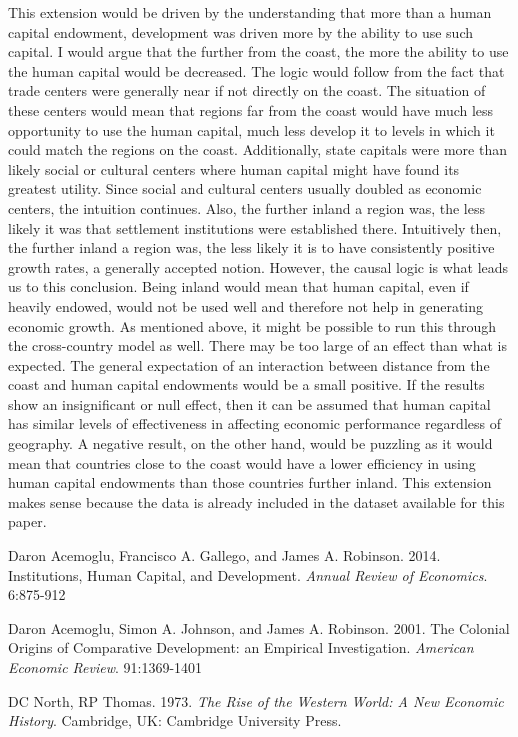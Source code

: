 \documentclass[12pt]{article}
\begin{document}
{This extension would be driven by the understanding that more than a human capital endowment, development was driven more by the ability to use such capital. I would argue that the further from the coast, the more the ability to use the human capital would be decreased. The logic would follow from the fact that trade centers were generally near if not directly on the coast. The situation of these centers would mean that regions far from the coast would have much less opportunity to use the human capital, much less develop it to levels in which it could match the regions on the coast. Additionally, state capitals were more than likely social or cultural centers where human capital might have found its greatest utility. Since social and cultural centers usually doubled as economic centers, the intuition continues. Also, the further inland a region was, the less likely it was that settlement institutions were established there. Intuitively then, the further inland a region was, the less likely it is to have consistently positive growth rates, a generally accepted notion. However, the causal logic is what leads us to this conclusion. Being inland would mean that human capital, even if heavily endowed, would not be used well and therefore not help in generating economic growth. As mentioned above, it might be possible to run this through the cross-country model as well. There may be too large of an effect than what is expected. The general expectation of an interaction between distance from the coast and human capital endowments would be a small positive. If the results show an insignificant or null effect, then it can be assumed that human capital has similar levels of effectiveness in affecting economic performance regardless of geography. A negative result, on the other hand, would be puzzling as it would mean that countries close to the coast would have a lower efficiency in using human capital endowments than those countries further inland. This extension makes sense because the data is already included in the dataset available for this paper.\\



\begin{thebibliography}{12}
Daron Acemoglu, Francisco A. Gallego, and James A. Robinson. 2014.
Institutions, Human Capital, and Development.
\textit{Annual Review of Economics}. 
6:875-912

Daron Acemoglu, Simon A. Johnson, and James A. Robinson. 2001.
The Colonial Origins of Comparative Development: an Empirical Investigation.
\textit{American Economic Review}. 
91:1369-1401
 
DC North, RP Thomas. 1973. 
\textit{The Rise of the Western World: A New Economic History}. 
Cambridge, UK: Cambridge University Press. 
\end{thebibliography}

}
\end{document}
